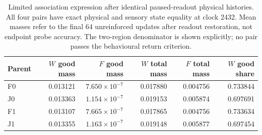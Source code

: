 \begin{table}[htbp]\centering\small
\caption{Limited association expression after identical paused-readout physical histories. All four pairs have exact physical and sensory state equality at clock 2432. Mean masses refer to the final 64 unreinforced updates after readout restoration, not endpoint probe accuracy. The two-region denominator is shown explicitly; no pair passes the behavioural return criterion.}\label{tab:readout-expression}
\setlength{\tabcolsep}{4pt}\begin{tabular}{lrrrrr}\toprule
Parent & $W$ good mass & $F$ good mass & $W$ total mass & $F$ total mass & $W$ good share\\\midrule
F0 & 0.013121 & $7.650\times10^{-7}$ & 0.017880 & 0.004756 & 0.733844\\
J0 & 0.013363 & $1.154\times10^{-7}$ & 0.019153 & 0.005874 & 0.697691\\
F1 & 0.013107 & $7.665\times10^{-7}$ & 0.017865 & 0.004756 & 0.733634\\
J1 & 0.013355 & $1.163\times10^{-7}$ & 0.019148 & 0.005877 & 0.697454\\
\bottomrule\end{tabular}\end{table}\FloatBarrier
